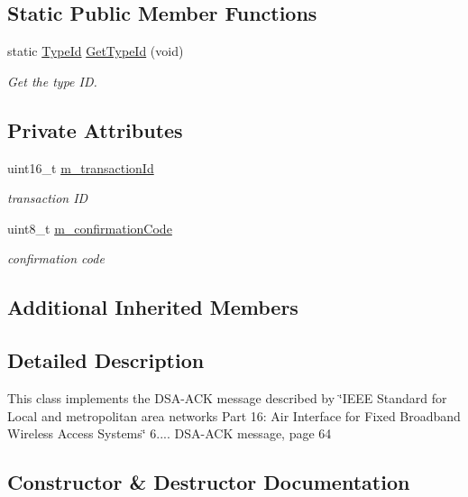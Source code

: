 \subsection*{Static Public Member Functions}
\begin{DoxyCompactItemize}
\item 
static \hyperlink{classns3_1_1TypeId}{Type\+Id} \hyperlink{classns3_1_1DsaAck_a9095af8a2ce76b4c414c875221fa2e0e}{Get\+Type\+Id} (void)
\begin{DoxyCompactList}\small\item\em Get the type ID. \end{DoxyCompactList}\end{DoxyCompactItemize}
\subsection*{Private Attributes}
\begin{DoxyCompactItemize}
\item 
uint16\+\_\+t \hyperlink{classns3_1_1DsaAck_a676b6f532f6aadd690d91090d2df7273}{m\+\_\+transaction\+Id}
\begin{DoxyCompactList}\small\item\em transaction ID \end{DoxyCompactList}\item 
uint8\+\_\+t \hyperlink{classns3_1_1DsaAck_af3f7f72451aefbe3bc723d5fad029e31}{m\+\_\+confirmation\+Code}
\begin{DoxyCompactList}\small\item\em confirmation code \end{DoxyCompactList}\end{DoxyCompactItemize}
\subsection*{Additional Inherited Members}


\subsection{Detailed Description}
This class implements the D\+S\+A-\/\+A\+CK message described by \char`\"{}\+I\+E\+E\+E Standard for
\+Local and metropolitan area networks Part 16\+: Air Interface for Fixed Broadband Wireless Access Systems\char`\"{} 6.... D\+S\+A-\/\+A\+CK message, page 64 

\subsection{Constructor \& Destructor Documentation}
